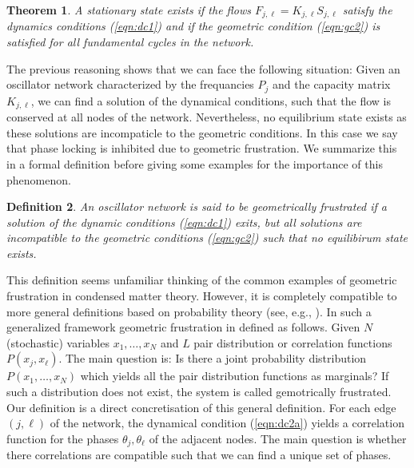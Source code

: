 \documentclass[10pt,aps,pra,onecolumn,superscriptaddress]{revtex4-1}
\newtheorem{thm}{Theorem}
\newtheorem{defn}[thm]{Definition}
\begin{document}
\begin{thm}
A stationary state exists if the flows 
   $F_{j,\ell} = K_{j,\ell} S_{j,\ell}$
satisfy the dynamics conditions (\ref{eqn:dc1})  and if
the geometric condition (\ref{eqn:gc2}) is satisfied for
all fundamental cycles in the network.
\end{thm}



The previous reasoning shows that we can face the following
situation: Given an oscillator network characterized by the
frequancies $P_j$ and the capacity matrix $K_{j,\ell}$,
we can find a solution of the dynamical conditions, such that
the flow is conserved at all nodes of the network. Nevertheless,
no equilibrium state exists as these solutions are incompaticle 
to the geometric conditions. In this case we say that phase
locking is inhibited due to geometric frustration. We 
summarize this in a formal definition before giving some
examples for the importance of this phenomenon. 


\begin{defn}
An oscillator network is said to be {geometrically 
frustrated} if a solution of the dynamic conditions 
(\ref{eqn:dc1}) exits, but all solutions are incompatible
to the geometric conditions (\ref{eqn:gc2}) such 
that no equilibirum state exists.
\end{defn}


This definition seems unfamiliar thinking of the common examples 
of geometric frustration in condensed matter theory. However, it is 
completely compatible to more general definitions based on probability
theory (see, e.g., \cite{Wolf03}). In such a generalized framework
geometric frustration in defined as follows.
Given $N$ (stochastic) variables $x_1,\ldots,x_N$ and $L$ pair
distribution or correlation functions $P(x_j,x_\ell)$. The main question 
is: Is there a joint probability distribution $P(x_1,\ldots,x_N)$ which
yields all the pair distribution functions as marginals? If such
a distribution does not exist, the system is called gemotrically
frustrated. Our definition is a direct concretisation of this
general definition. For each edge $(j,\ell)$ of the network, the 
dynamical condition (\ref{eqn:dc2a})  yields a correlation function for the phases
$\theta_j, \theta_\ell$ of the adjacent nodes. The main question is 
whether there correlations are compatible such that we can 
find a unique set of phases.
\end{document}
